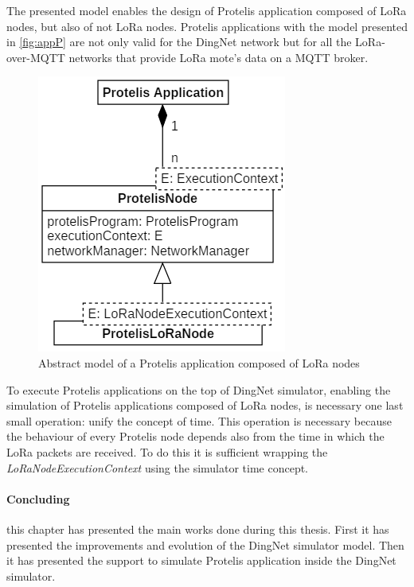 % 
The presented model enables the design of Protelis application composed of LoRa nodes, but also of not LoRa nodes.
Protelis applications with the model presented in \autoref{fig:appP} are not only valid for the DingNet network but for all the LoRa-over-MQTT networks that provide LoRa mote's data on a MQTT broker.
% 
\begin{figure}[H]
    \centering
    \includegraphics{figures/app.png}
    \caption{Abstract model of a Protelis application composed of LoRa nodes}
    \label{fig:appP}
\end{figure}
% 
\noindent To execute Protelis applications on the top of DingNet simulator, enabling the simulation of Protelis applications composed of LoRa nodes, is necessary one last small operation: unify the concept of time. 
This operation is necessary because the behaviour of every Protelis node depends also from the time in which the LoRa packets are received.
To do this it is sufficient wrapping the \mbox{\textit{LoRaNodeExecutionContext}} using the simulator time concept.

\paragraph{Concluding} this chapter has presented the main works done during this thesis. First it has presented the improvements and evolution of the DingNet simulator model. Then it has presented the support to simulate Protelis application inside the DingNet simulator. 